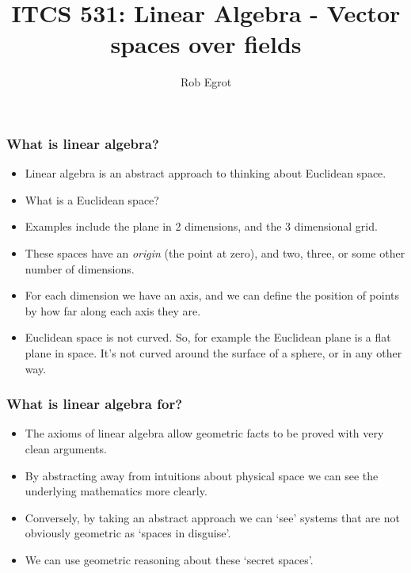\documentclass[handout]{beamer}
\title{ITCS 531: Linear Algebra - Vector spaces over fields}
\date{}
\author{Rob Egrot}
\begin{document}
\begin{frame}
\titlepage
\end{frame}

\begin{frame}
\frametitle{What is linear algebra?}
\begin{itemize}
\item Linear algebra is an abstract approach to thinking about Euclidean space.
\vspace{0.3cm}
\item What is a Euclidean space?
\vspace{0.3cm}
\item Examples include the plane in 2 dimensions, and the 3 dimensional grid.
\vspace{0.3cm}
\item These spaces have an \emph{origin} (the point at zero), and two, three, or some other number of dimensions.
\vspace{0.3cm}
\item For each dimension we have an axis, and we can define the position of points by how far along each axis they are.
\vspace{0.3cm}
\item Euclidean space is not curved. So, for example the Euclidean plane is a flat plane in space. It's not curved around the surface of a sphere, or in any other way.
\end{itemize}
\end{frame}

\begin{frame}
\frametitle{What is linear algebra for?}
\begin{itemize}
\item The axioms of linear algebra allow geometric facts to be proved with very clean arguments.
\vspace{0.6cm}
\item By abstracting away from intuitions about physical space we can see the underlying mathematics more clearly.
\vspace{0.6cm}
\item Conversely, by taking an abstract approach we can `see' systems that are not obviously geometric as `spaces in disguise'.
\vspace{0.6cm}
\item We can use geometric reasoning about these `secret spaces'. 
\end{itemize}
\end{frame}
\end{document}
